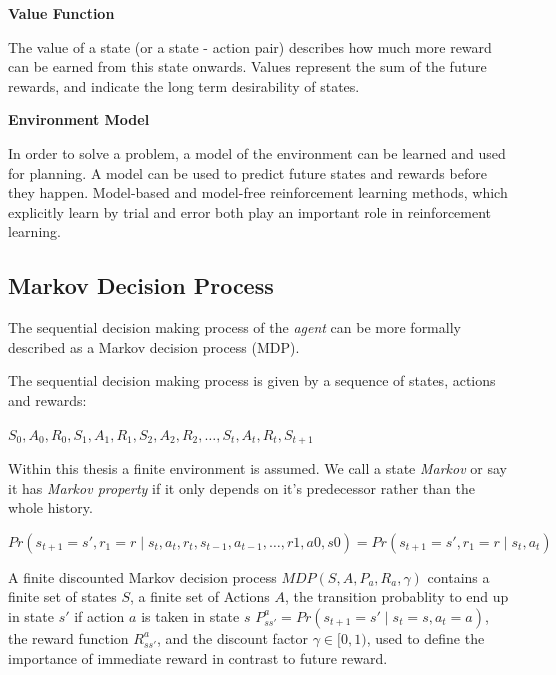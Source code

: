 \textbf{Value Function}

The value of a state (or a state - action pair) describes how much more reward can be earned from this state onwards. Values represent the sum of the future rewards, and indicate the long term desirability of states.

\textbf{Environment Model}

In order to solve a problem, a model of the environment can be learned and used for planning. A model can be used to predict future states and rewards before they happen.
Model-based and model-free reinforcement learning methods, which explicitly learn by trial and error both play an important role in reinforcement learning.

\pagebreak

\subsection{Markov Decision Process} 

The sequential decision making process of the \textit{agent} can be more formally described as a Markov decision process (MDP).

The sequential decision making process is given by a sequence of states, actions and rewards:

$S_0, A_0, R_0, S_1, A_1, R_1, S_2, A_2, R_2, \dots, S_t,A_t,R_t, S_{t+1}$

Within this thesis a finite environment is assumed. We call a state \textit{Markov} or say it has \textit{Markov property} if it only depends on it's predecessor rather than the whole history.

$Pr(s_{t+1} = s', r_1 = r \mid s_t, a_t, r_t, s_{t-1},a_{t-1}, \dots ,r1,a0,s0) = Pr(s_{t+1} = s', r_1 = r \mid s_t,a_t)$

A finite discounted Markov decision process $MDP(S,A,P_a,R_a,\gamma)$ contains a finite set of states $S$, 
a finite set of Actions $A$,
the transition probablity to end up in state $s'$ if action $a$ is taken in state $s$
$P^a_{s s'} = Pr(s_{t+1} = s' \mid s_t = s, a_t = a)$,
the reward function $R^a_{s s'}$,
and the discount factor $\gamma  \in [0,1)$, used to define the importance of immediate reward in contrast to future reward. 

\pagebreak
